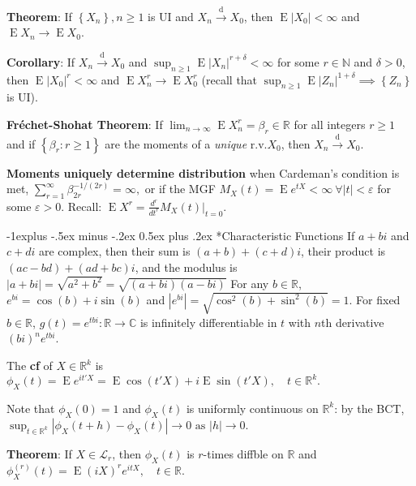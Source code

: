 \documentclass[paper=letter,fontsize=2.89mm]{scrartcl}
\makeatletter
\DeclareMathOperator{\E}{E}
\newcommand{\convdist}{\stackrel{\text{d}}{\longrightarrow}}
\newcommand{\eps}{\varepsilon}
\newcommand{\R}{\mathbb{R}}
\newcommand{\C}{\mathbb{C}}
\newcommand{\N}{\mathbb{N}}
\newcommand\abs[1]{\left| #1 \right|}
\newcommand\set[1]{\left\{ #1 \right\}}
\renewcommand{\subsection}{\@startsection{subsection}{2}{0mm}%
                                {-1explus -.5ex minus -.2ex}%
                                {0.5ex plus .2ex}%
                                {\normalfont\normalsize\bfseries}}
\makeatother
\begin{document}
\begin{multicols*}{3}
\textbf{Theorem}: If $\set{X_n}, n\ge1$ is UI and $X_n \convdist X_0$, then $\E\abs{X_0} < \infty$ and $\E X_n \to \E X_0$. \\ \medskip

\textbf{Corollary}:
If $X_n \convdist X_0$ and $\sup_{n\ge1} \E\abs{X_n}^{r+\delta} < \infty$ for some $r \in \N$ and $\delta > 0$, then $\E\abs{X_0}^r < \infty$ and $\E X_n^r \to \E X_0^r$ (recall that $\sup_{n\ge1} \E\abs{Z_n}^{1+\delta} \implies \set{Z_n}$ is UI). \\ \medskip 

\textbf{Fr\'{e}chet-Shohat Theorem}: If $\lim_{n\to\infty} \E X_n^r = \beta_r \in \R$ for all integers $r \ge 1$ and if $\set{\beta_r: r \ge 1}$ are the moments of a \emph{unique} r.v.\@ $X_0$, then $X_n \convdist X_0$. \\ \medskip

\textbf{Moments uniquely determine distribution} when Cardeman's condition is met, $\sum_{r=1}^\infty \beta_{2r}^{-1/(2r)} = \infty,$ or if the MGF $M_X(t) = \E e^{tX} < \infty ~ \forall \abs{t} < \eps$ for some $\eps > 0$. Recall: $\E X^r = \frac{d^r}{dt^r} M_X(t) \bigg|_{t=0}.$ \\ \medskip

\subsection*{Characteristic Functions}
If $a + bi$ and $c + di$ are complex, then their sum is $(a + b) + (c+d)i$, their product is $(ac - bd) + (ad + bc)i$, and the modulus is $\abs{a + bi} = \sqrt{a^2 + b^2} = \sqrt{(a+bi)(a-bi)}$ For any $b \in \R$, $e^{bi} = \cos(b) + i \sin(b)$ and $\abs{e^{bi}} = \sqrt{\cos^2(b) + \sin^2(b)} =1$. For fixed $b \in \R$, $g(t) = e^{tbi}: \R \to \C$ is infinitely differentiable in $t$ with $n$th derivative $(bi)^n e^{tbi}$. \\ \medskip

The \textbf{cf} of $X \in \R^k$ is
$\phi_X(t) = \E e^{it'X} = \E \cos(t'X) + i \E \sin(t'X), \quad t\in \R^k.$ \\ \medskip

Note that $\phi_X(0) = 1$ and $\phi_X(t)$ is uniformly continuous on $\R^k$: by the BCT,
$\sup_{t\in\R^k} \abs{\phi_X(t+h) - \phi_X(t)} \to 0 \text{ as } \abs{h} \to 0.$ \\ \medskip

\textbf{Theorem}: If $X \in \mathcal{L}_r$, then $\phi_X(t)$ is $r$-times diffble on $\R$ and
$\phi^{(r)}_X(t) = \E (iX)^r e^{itX}, \quad t \in \R.$ \\ \medskip


\end{multicols*}
\end{document}
